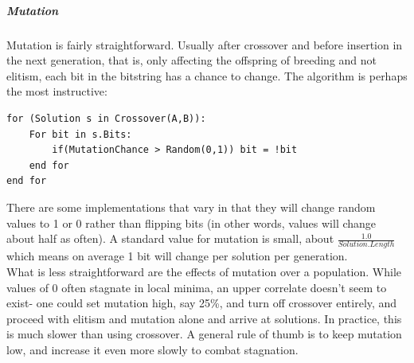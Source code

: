 \subparagraph{Mutation}
Mutation is fairly straightforward.  Usually after crossover and before insertion in the next generation, that is, only affecting the offspring of breeding and not elitism, each bit in the bitstring has a chance to change.  The algorithm is perhaps the most instructive: \begin{lstlisting}
for (Solution s in Crossover(A,B)):
	For bit in s.Bits:
		if(MutationChance > Random(0,1)) bit = !bit
	end for
end for
\end{lstlisting}
There are some implementations that vary in that they will change random values to 1 or 0 rather than flipping bits (in other words, values will change about half as often).  A standard value for mutation is small, about 
${\frac{1.0}{Solution.Length}}$ which means on average 1 bit will change per solution per generation.\\
What is less straightforward are the effects of mutation over a population.  While values of 0 often stagnate in local minima, an upper correlate doesn't seem to exist- one could set mutation high, say 25\%, and turn off crossover entirely, and proceed with elitism and mutation alone and arrive at solutions.  In practice, this is much slower than using crossover. A general rule of thumb is to keep mutation low, and increase it even more slowly to combat stagnation.\\
